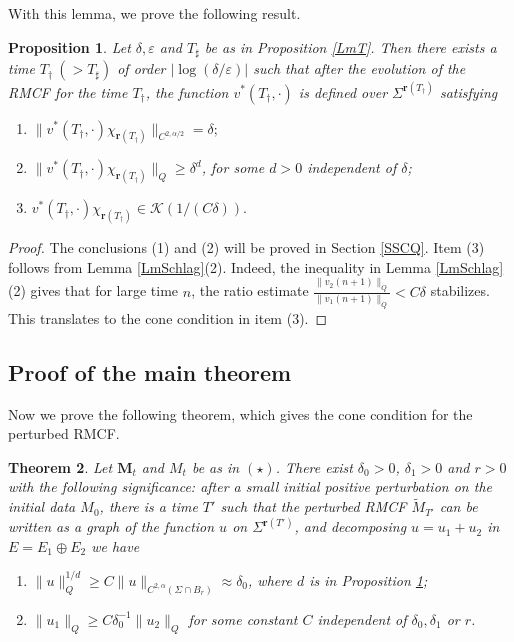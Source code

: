 \documentclass[12pt]{amsart}
\numberwithin{equation}{section}
\newtheorem{theorem}{Theorem}[section]
\newtheorem{proposition}[theorem]{Proposition}
\numberwithin{equation}{section}
\newcommand{\eps}{\varepsilon}
\newcommand{\dt}{\delta}
\newcommand{\al}{\alpha}
\begin{document}
	
	With this lemma, we prove the following result.
	
	\begin{proposition}\label{ThmDynamics}
		Let $\dt,\eps $ and $T_\sharp$ be as in Proposition \ref{LmT}. Then there exists a time $T_\dagger\ (>T_\sharp)$ of order $|\log (\dt/\eps)|$ such that after the evolution of the RMCF for the time $T_\dagger$, the function $ v^*(T_\dagger,\cdot)$ is defined over $\Sigma^{\mathbf  r({T_\dagger})}$ satisfying  
		\begin{enumerate}
			\item $\| v^*(T_\dagger,\cdot)\chi_{\mathbf  r({T_\dagger})}\|_{C^{2,\al/2}}=\dt;$ 
			\item $\| v^*(T_\dagger,\cdot )\chi_{\mathbf  r({T_\dagger})}\|_{Q}\geq\dt^{d}$, for some $d>0$ independent of $\dt$;
			\item $v^*(T_\dagger,\cdot)\chi_{\mathbf  r({T_\dagger})}\in \mathcal K(1/(C\dt)). $
		\end{enumerate}
	\end{proposition}
	\begin{proof}
		The conclusions (1) and (2) will be proved in Section \ref{SSCQ}. Item (3) follows from Lemma \ref{LmSchlag}(2). Indeed, the inequality in Lemma \ref{LmSchlag}(2) gives that for large time $n$, the ratio estimate $\frac{\|v_2(n+1)\|_Q}{\|v_1(n+1)\|_Q}<C\dt$ stabilizes. This translates to the cone condition in item (3). 
	\end{proof}
	
	
	\subsection{Proof of the main theorem}\label{SSProofMain}
	
	Now we prove the following theorem, which gives the cone condition for the perturbed RMCF.  
	\begin{theorem}\label{ThmMainSec4}
		Let $\mathbf{M}_t$ and $M_t$ be as in $(\star)$. There exist $\delta_0>0$, $\delta_1>0$ and $r>0$ with the following significance: after a small initial positive perturbation on the initial data $M_0$, there is a time $T'$ such that  the perturbed RMCF $\widetilde{M}_{T'}$ can be written as a graph of the function $u$ on $\Sigma^{\mathbf{r}({T'})}$, and decomposing $u=u_1+u_2$ in $E=E_1\oplus E_2$ we have
		\begin{enumerate}
			\item $\|u\|_{Q}^{1/d}\geq C \|u\|_{C^{2,\alpha}(\Sigma\cap B_r)}\approx\delta_0$, where $d$ is in Proposition \ref{ThmDynamics};
			\item $\|u_1\|_Q\geq C\dt_0^{-1}\|u_2\|_Q$ for some constant $C$ independent of $\delta_0,\delta_1$ or $r$.
		\end{enumerate}
	\end{theorem}
	
\end{document}
